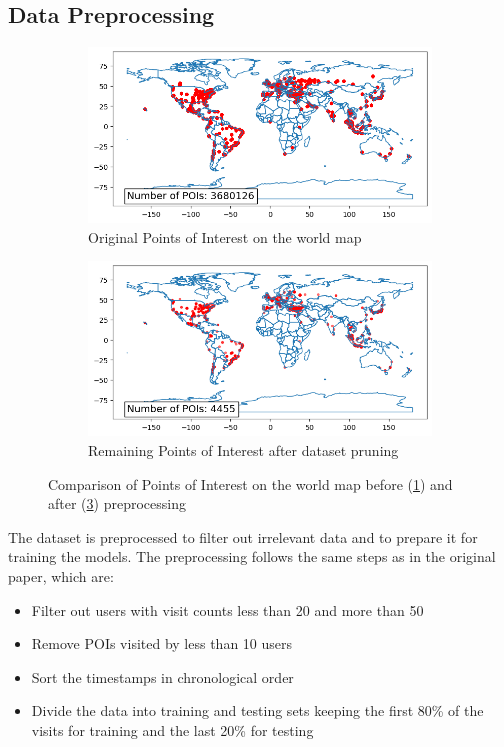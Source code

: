 \documentclass[twocolumn,twoside]{article}
\begin{document}
\subsection{Data Preprocessing}
\begin{figure}[ht]
  \centering
  \begin{subfigure}[b]{0.95\linewidth}
    \centering
    \includegraphics[width=\linewidth]{poi_original.png}
    \caption{Original Points of Interest on the world map}
    \label{fig:data}
  \end{subfigure}
  \hfill
  \begin{subfigure}[b]{0.95\linewidth}
    \centering
    \includegraphics[width=\linewidth]{poi_after_processing.png}
    \caption{Remaining Points of Interest after dataset pruning}
    \label{fig:preprocessed_data}
  \end{subfigure}
  \caption{Comparison of Points of Interest on the world map before (\ref{fig:data}) and after (\ref{fig:preprocessed_data}) preprocessing}
\end{figure}
The dataset is preprocessed to filter out irrelevant data and to prepare
 it for training the models.
The preprocessing follows the same steps as in the original paper, which are:
\begin{itemize}
  \item Filter out users with visit counts less than 20 and more than 50
  \item Remove POIs visited by less than 10 users
  \item Sort the timestamps in chronological order
  \item Divide the data into training and testing sets keeping the first 80\% of the visits for training and the last 20\% for testing
\end{itemize}
\end{document}
